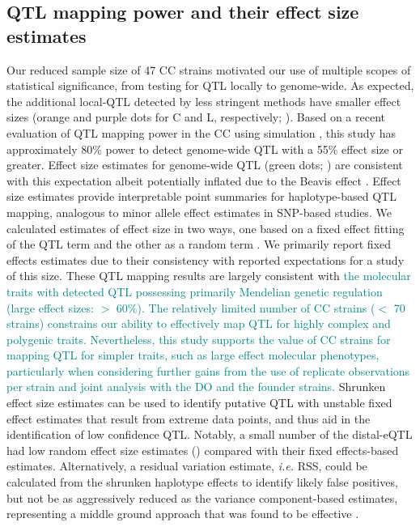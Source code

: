 \documentclass[10pt,letterpaper]{article}
\newcommand{\ie}{\emph{i.e.}\xspace}
\newcommand{\GKinline}[1]{\textcolor{teal}{#1}}
\begin{document}
\subsection*{QTL mapping power and their effect size estimates}

Our reduced sample size of 47 CC strains motivated our use of multiple scopes of statistical significance, from testing for QTL locally to genome-wide. As expected, the additional local-QTL detected by less stringent methods have smaller effect sizes (orange and purple dots for C and L, respectively; ). Based on a recent evaluation of QTL mapping power in the CC using simulation \cite{Keele2019}, this study has approximately 80\% power to detect genome-wide QTL with a 55\% effect size or greater. Effect size estimates for genome-wide QTL (green dots; ) are consistent with this expectation albeit potentially inflated due to the Beavis effect \cite{Xu2003}. 
Effect size estimates provide interpretable point summaries for haplotype-based QTL mapping, analogous to minor allele effect estimates in SNP-based studies. We calculated estimates of effect size in two ways, one based on a fixed effect fitting of the QTL term and the other as a random term \cite{Wei2016}. 
We primarily report fixed effects estimates due to their consistency with reported expectations \cite{Keele2019} for a study of this size. %
These QTL mapping results are largely consistent with 
\GKinline{the molecular traits with detected QTL possessing primarily Mendelian genetic regulation (large effect sizes: $>$ 60\%). The relatively limited number of CC strains ($<$ 70 strains) constrains our ability to effectively map QTL for highly complex and polygenic traits. Nevertheless, this study supports the value of CC strains for mapping QTL for simpler traits, such as large effect molecular phenotypes, particularly when considering further gains from the use of replicate observations per strain and joint analysis with the DO and the founder strains.}
Shrunken effect size estimates can be used to identify putative QTL with unstable fixed effect estimates that result from extreme data points, and thus aid in the identification of low confidence QTL. Notably, a small number of the distal-eQTL had low random effect size estimates () compared with their fixed effects-based estimates. Alternatively, a residual variation estimate, \ie RSS, could be calculated from the shrunken haplotype effects to identify likely false positives, but not be as aggressively reduced as the variance component-based estimates, representing a middle ground approach that was found to be effective \cite{Keele2018}.
\end{document}
